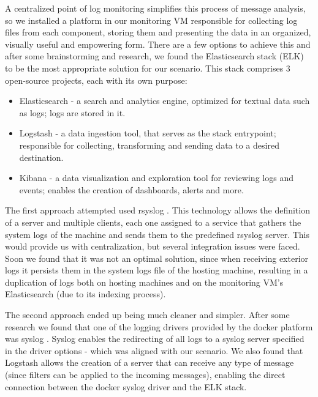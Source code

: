 \documentclass[12pt]{article}
\begin{document}
A centralized point of log monitoring simplifies this process of message analysis, so we installed a platform in our monitoring VM responsible for collecting
log files from each component, storing them and presenting the data in an organized, visually useful and empowering form.
There are a few options to achieve this and after some brainstorming and research, we found the Elasticsearch stack (ELK) \cite{elk} to be the most appropriate
solution for our scenario.
This stack comprises 3 open-source projects, each with its own purpose:

\vspace{-10pt}
\begin{itemize} [noitemsep]
  \item Elasticsearch - a search and analytics engine, optimized for textual data such as logs; logs are stored in it.
  \item Logstash - a data ingestion tool, that serves as the stack entrypoint; responsible for collecting, transforming and sending data to a desired destination.
  \item Kibana - a data visualization and exploration tool for reviewing logs and events; enables the creation of dashboards, alerts and more.
\end{itemize}
\vspace{-10pt}

The first approach attempted used rsyslog \cite{rsyslog}.
This technology allows the definition of a server and multiple clients, each one assigned to a service that gathers the system logs of the machine and sends
them to the predefined rsyslog server.
This would provide us with centralization, but several integration issues were faced.
Soon we found that it was not an optimal solution, since when receiving exterior logs it persists them in the system logs file of the hosting machine, resulting
in a duplication of logs both on hosting machines and on the monitoring VM's Elasticsearch (due to its indexing process).

The second approach ended up being much cleaner and simpler.
After some research we found that one of the logging drivers provided by the docker platform was syslog \cite{dockersyslog}.
Syslog enables the redirecting of all logs to a syslog server specified in the driver options - which was aligned with our scenario.
We also found that Logstash allows the creation of a server that can receive any type of message (since filters can be applied to the incoming messages),
enabling the direct connection between the docker syslog driver and the ELK stack.
\end{document}
